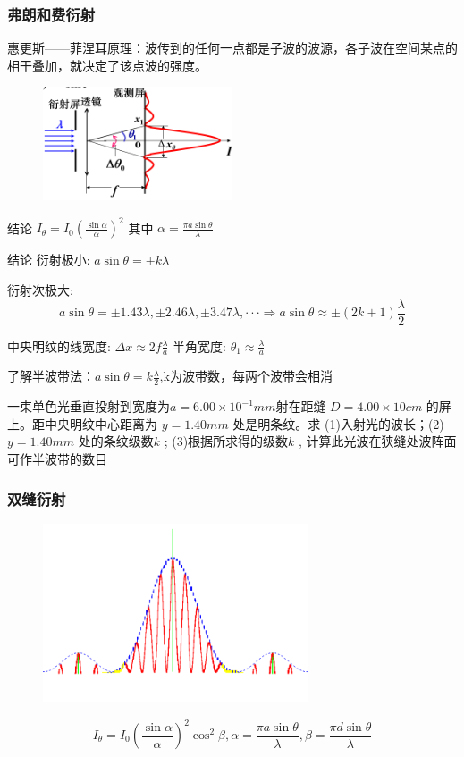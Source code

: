 \documentclass[UTF8]{ctexbeamer}
\begin{document}
\begin{frame}
\frametitle{弗朗和费衍射}
惠更斯——菲涅耳原理：波传到的任何一点都是子波的波源，各子波在空间某点的相干叠加，就决定了该点波的强度。
\begin{figure}[!ht]
	\centering
	\includegraphics[width=0.5\textwidth]{24}
\end{figure}
\begin{block}{结论}
	$I_\theta=I_0\left(\frac{\sin \alpha}{\alpha}\right)^2$ 其中 $\alpha=\frac{\pi a \sin \theta}{\lambda}$
\end{block}
\end{frame}
\begin{frame}

	\begin{block}{结论}
		衍射极小: $a\sin\theta=\pm k\lambda $
		
		衍射次极大:$$a\sin\theta{=}\pm1.43\lambda,\pm2.46\lambda,\pm3.47\lambda,\cdotp\cdotp\cdotp\Rightarrow a\sin\theta{\approx}\pm(2k+1)\frac\lambda2$$
		
		中央明纹的线宽度: $\Delta x \approx 2 f \frac{\lambda}{a}$ 半角宽度: $\theta_1 \approx \frac{\lambda}{a}$
	\end{block}
	了解半波带法：$a\sin\theta=k\frac\lambda2$,k为波带数，每两个波带会相消
	\begin{examples}
		一束单色光垂直投射到宽度为$a=6.00\times10^{-1}mm$射在距缝 $D=4.00\times10cm$ 的屏上。距中央明纹中心距离为 $y=1.40mm$ 处是明条纹。求 (1)入射光的波长；(2)$y=1.40mm$ 处的条纹级数$k$ ; (3)根据所求得的级数$k$ , 计算此光波在狭缝处波阵面可作半波带的数目
	\end{examples}
\end{frame}
\begin{frame}
\frametitle{双缝衍射}
\begin{figure}[!ht]
	\centering
	\includegraphics[width=0.7\textwidth]{31}
\end{figure}
$$
I_\theta=I_0\left(\frac{\sin \alpha}{\alpha}\right)^2 \cos ^2 \beta,\alpha=\frac{\pi a \sin \theta}{\lambda} ,\beta=\frac{\pi d \sin \theta}{\lambda}
$$
\end{frame}
\end{document}
